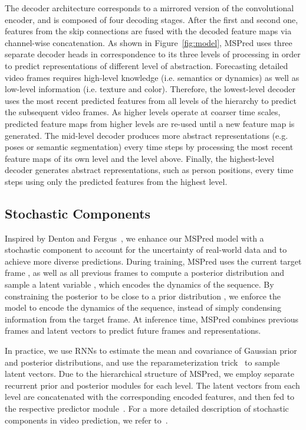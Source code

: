 \documentclass{bmvc2k}
\newcommand{\Figure}[1]{Figure~\ref{#1}}
\begin{document}
The decoder architecture corresponds to a mirrored version of the convolutional encoder, and is composed of four decoding stages.
After the first and second one, features from the skip connections are fused with the decoded feature maps via channel-wise concatenation. As shown in \Figure{fig:model}, MSPred uses three separate decoder heads in correspondence to its three levels of processing in order to predict representations of different level of abstraction.
Forecasting detailed video frames requires high-level knowledge (i.e. semantics or dynamics) as well as low-level information (i.e. texture and color). Therefore, the lowest-level decoder uses the most recent predicted features from all levels of the hierarchy to predict the subsequent video frames.
As higher levels operate at coarser time scales, predicted feature maps from higher levels are re-used until a new feature map is generated.
The mid-level decoder produces more abstract representations (e.g. poses or semantic segmentation) every  time steps by processing the most recent feature maps of its own level and the level above.
Finally, the highest-level decoder generates abstract representations, such as person positions, every  time steps using only the predicted features from the highest level.



\subsection{Stochastic Components}
\label{section: Stochastic}

Inspired by Denton and Fergus~\cite{Denton_StochasticVideoGenerationWithALearnedPrior_2018}, we enhance our MSPred model with a stochastic component to account for the uncertainty of real-world data and to achieve more diverse predictions.
During training, MSPred uses the current target frame , as well as all previous frames  to compute a posterior distribution  and sample a latent variable , which encodes the dynamics of the sequence.
By constraining the posterior to be close to a prior distribution , we enforce the model to encode the dynamics of the sequence, instead of simply condensing information from the target frame.
At inference time, MSPred combines previous frames  and latent vectors  to predict future frames and representations.

In practice, we use RNNs to estimate the mean and covariance of Gaussian prior and posterior distributions, and use the reparameterization trick~\cite{Kingma_AutoEncodingVariationalBayes_2013} to sample latent vectors.
Due to the hierarchical structure of MSPred, we employ separate recurrent prior  and posterior  modules for each level.
The latent vectors from each level are concatenated with the corresponding encoded features, and then fed to the respective predictor module~\cite{Sonderby_LadderVariationalAutoencoders_2016, Castrejon_ImprovedVRNNsForVideoPrediction_2019}.
For a more detailed description of stochastic components in video prediction, we refer to~\cite{Denton_StochasticVideoGenerationWithALearnedPrior_2018}.
\end{document}
